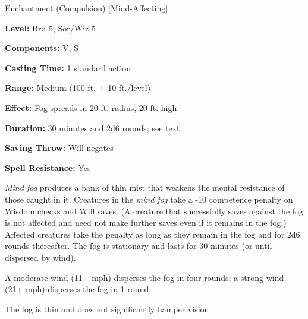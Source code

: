 
Enchantment (Compulsion) [Mind-Affecting]

\textbf{Level:} Brd 5, Sor/Wiz 5

\textbf{Components:} V, S

\textbf{Casting Time:} 1 standard action

\textbf{Range:} Medium (100 ft. + 10 ft./level)

\textbf{Effect:} Fog spreads in 20-ft. radius, 20 ft. high

\textbf{Duration:} 30 minutes and 2d6 rounds; see text

\textbf{Saving Throw:} Will negates

\textbf{Spell Resistance:} Yes

\textit{Mind fog} produces a bank of thin mist that weakens the mental resistance 
of those caught in it. Creatures in the \textit{mind fog} take a -10 competence 
penalty on Wisdom checks and Will saves. (A creature that successfully saves against 
the fog is not affected and need not make further saves even if it remains in the 
fog.) Affected creatures take the penalty as long as they remain in the fog and 
for 2d6 rounds thereafter. The fog is stationary and lasts for 30 minutes (or until 
dispersed by wind).

A moderate wind (11+ mph) disperses the fog in four rounds; a strong wind (21+ 
mph) disperses the fog in 1 round.

The fog is thin and does not significantly hamper vision.


